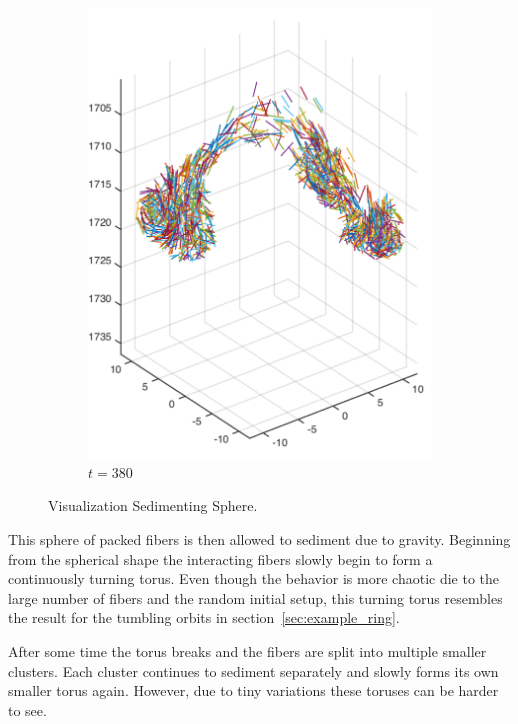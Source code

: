 \documentclass[a4paper,11pt]{kth-mag}
\begin{document}
\begin{figure}[!htbp]
\begin{subfigure}[h]{0.4\textwidth}
    \includegraphics[width=\textwidth]{img/state_00380.pdf}
    \caption{$t=380$}\label{fig:sphere_simulation_1d}
  \end{subfigure}
  \caption{Visualization Sedimenting Sphere.}
  \label{fig:sphere_simulation}
\end{figure}

This sphere of packed fibers is then allowed to sediment due to gravity. Beginning from the spherical shape the interacting fibers slowly begin to form a continuously turning torus. Even though the behavior is more chaotic die to the large number of fibers and the random initial setup, this turning torus resembles the result for the tumbling orbits in section~\ref{sec:example_ring}.

After some time the torus breaks and the fibers are split into multiple smaller clusters. Each cluster continues to sediment separately and slowly forms its own smaller torus again. However, due to tiny variations these toruses can be harder to see.
\end{document}
